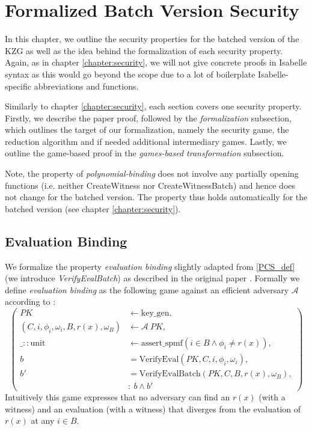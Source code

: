 \chapter{Formalized Batch Version Security}\label{chapter:batch_security}
In this chapter, we outline the security properties for the batched version of the KZG as well as the idea behind the formalization of each security property. Again, as in chapter \ref{chapter:security}, we will not give concrete proofs in Isabelle syntax as this would go beyond the scope due to a lot of boilerplate Isabelle-specific abbreviations and functions.

Similarly to chapter \ref{chapter:security}, each section covers one security property. Firstly, we describe the paper proof, followed by the \textit{formalization} subsection, which outlines the target of our formalization, namely the security game, the reduction algorithm and if needed additional intermediary games. Lastly, we outline the game-based proof in the \textit{games-based transformation} subsection.

Note, the property of \textit{polynomial-binding} does not involve any partially opening functions (i.e. neither CreateWitness nor CreateWitnessBatch) and hence does not change for the batched version. The property thus holds automatically for the batched version (see chapter \ref{chapter:security}).

\section{Evaluation Binding}
We formalize the property \textit{evaluation binding} slightly adapted from \ref{PCS_def} (we introduce \textit{VerifyEvalBatch}) as described in the original paper \parencite{KZG}. Formally we define \textit{evaluation binding} as the following game against an efficient adversary $\mathcal{A}$ according to \parencite{KZG}: 
\begin{equation*}
    \left(
        \begin{aligned}
            PK & \leftarrow \text{key\_gen}, \\
            (C, i,\phi_i,\omega_i, B, r(x),\omega_B) & \leftarrow \mathcal{A} \ PK, \\
            \_::\text{unit} & \leftarrow \text{assert\_spmf}(i\in B \land \phi_i \ne r(x)), \\
            b &= \text{VerifyEval}(PK, C, i, \phi_i, \omega_i),\\
            b' &= \text{VerifyEvalBatch}(PK, C, B, r(x), \omega_B),\\
            & : \ b \land b'
        \end{aligned}
        \right)
\end{equation*}
Intuitively this game expresses that no adversary can find an $r(x)$ (with a witness) and an evaluation (with a witness) that diverges from the evaluation of $r(x)$ at any $i \in B$.

